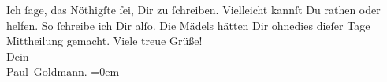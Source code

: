 \begin{ledgroupsized}[t]{13cm}
               Ich ſage, das Nöthigſte ſei, Dir zu {\pb}ſchreiben.
               Vielleicht kannſt Du rathen oder helfen. So ſchreibe ich Dir alſo. Die Mädels hätten Dir
               ohnedies dieſer Tage Mittheilung gemacht.\pend
           \pstart
           Viele treue Grüße! {\\[\baselineskip]}Dein {\\[\baselineskip]}\spacefill\mbox{Paul Goldmann.}\pend
           \leftskip=0em{}
         
         \endnumbering{}\end{ledgroupsized}\begin{anhang}\end{anhang}\newcommand{\dateiname}{L02918}\newcommand{\titel}{Paul Goldmann an Arthur Schnitzler, 31. 5. [1900]}\newcommand{\editorInnen}{Martin Anton Müller und Laura Untner}
      